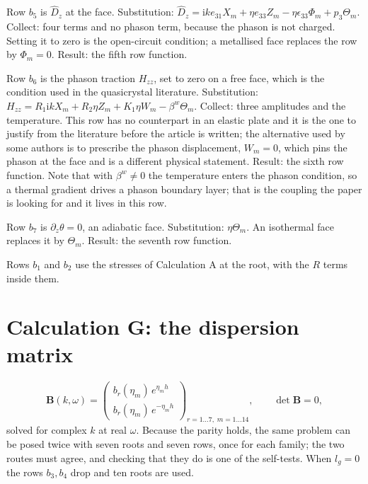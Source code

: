\documentclass[11pt]{article}
\makeatletter
\newif\ifshowworked
\newenvironment{worked}{%
  \ifshowworked\par\smallskip\noindent\textit{Working.}\par\smallskip\else
  \setbox\z@\vbox\bgroup\fi}{\ifshowworked\par\smallskip\else\egroup\fi}
\newcommand{\ii}{\mathrm{i}}
\makeatother
\begin{document}
\begin{worked}
Row $b_5$ is $\hat D_z$ at the face. Substitution:
$\hat D_z=\ii ke_{31}X_m+\eta e_{33}Z_m-\eta\epsilon_{33}\Phi_m+p_3\Theta_m$. Collect: four terms and no
phason term, because the phason is not charged. Setting it to zero is the open-circuit condition; a
metallised face replaces the row by $\Phi_m=0$. Result: the fifth row function.
\end{worked}

\begin{worked}
Row $b_6$ is the phason traction $H_{zz}$, set to zero on a free face, which is the condition used in the
quasicrystal literature. Substitution:
$H_{zz}=R_1\ii kX_m+R_2\eta Z_m+K_1\eta W_m-\beta^{w}\Theta_m$. Collect: three amplitudes and the
temperature. This row has no counterpart in an elastic plate and it is the one to justify from the
literature before the article is written; the alternative used by some authors is to prescribe the phason
displacement, $W_m=0$, which pins the phason at the face and is a different physical statement. Result:
the sixth row function. Note that with $\beta^{w}\ne0$ the temperature enters the phason condition, so a
thermal gradient drives a phason boundary layer; that is the coupling the paper is looking for and it
lives in this row.
\end{worked}

\begin{worked}
Row $b_7$ is $\partial_z\theta=0$, an adiabatic face. Substitution: $\eta\Theta_m$. An isothermal face
replaces it by $\Theta_m$. Result: the seventh row function.
\end{worked}

Rows $b_1$ and $b_2$ use the stresses of Calculation A at the root, with the $R$ terms inside them.

\section{Calculation G: the dispersion matrix}\label{sec:calcG}

\begin{equation}
\mathbf B(k,\omega)=
\begin{pmatrix}
b_r(\eta_m)\,e^{\eta_mh}\\
b_r(\eta_m)\,e^{-\eta_mh}
\end{pmatrix}_{r=1\dots7,\;m=1\dots14},
\qquad \det\mathbf B=0 ,
\end{equation}
solved for complex $k$ at real $\omega$. Because the parity holds, the same problem can be posed twice with
seven roots and seven rows, once for each family; the two routes must agree, and checking that they do is
one of the self-tests. When $l_g=0$ the rows $b_3,b_4$ drop and ten roots are used.
\end{document}
